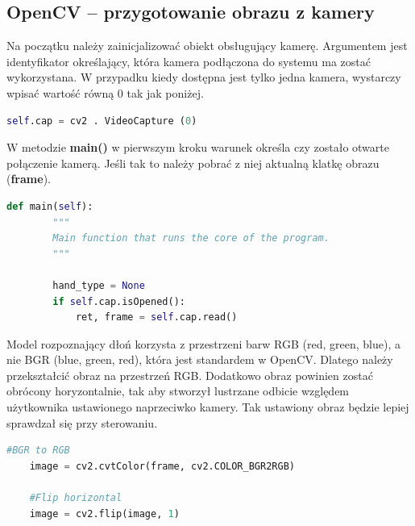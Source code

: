 \subsection{OpenCV -- przygotowanie obrazu z kamery}

\quad Na początku należy zainicjalizować obiekt obsługujący kamerę. Argumentem jest identyfikator określający, która kamera podłączona do systemu ma zostać wykorzystana. W przypadku kiedy dostępna jest tylko jedna kamera, wystarczy wpisać wartość równą 0 tak jak poniżej.\newline

\begin{lstlisting}[language=python, style=programming, captionpos=b, caption={Wybór kamery}]
    self.cap = cv2 . VideoCapture (0)
\end{lstlisting}

\quad W metodzie \textbf{main()} w pierwszym kroku warunek określa czy zostało otwarte połączenie kamerą. Jeśli tak to należy pobrać z niej aktualną klatkę obrazu (\textbf{frame}). \newline

\begin{lstlisting}[language=python, style=programming, captionpos=b, caption={Przygotowanie funkcji głównej}]
    def main(self):
        """
        Main function that runs the core of the program. 
        """

        hand_type = None
        if self.cap.isOpened():
            ret, frame = self.cap.read()
\end{lstlisting}

\quad Model rozpoznający dłoń korzysta z przestrzeni barw RGB (red, green, blue), a nie BGR (blue, green, red), która jest standardem w OpenCV. Dlatego należy przekształcić obraz na przestrzeń RGB. Dodatkowo obraz powinien zostać obrócony horyzontalnie, tak aby stworzył lustrzane odbicie względem użytkownika ustawionego naprzeciwko kamery. Tak ustawiony obraz będzie lepiej sprawdzał się przy sterowaniu. \newline

\begin{lstlisting}[language=python, style=programming, captionpos=b, caption={Pierwsze przekształcenie}]
    #BGR to RGB
    image = cv2.cvtColor(frame, cv2.COLOR_BGR2RGB)

    #Flip horizontal
    image = cv2.flip(image, 1)
\end{lstlisting}


